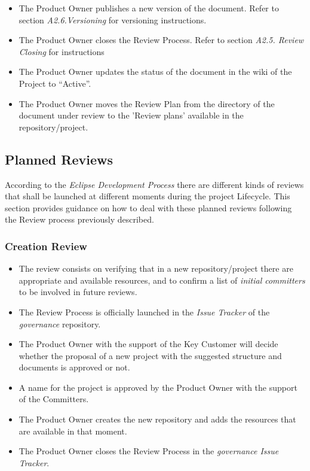 \documentclass{template/openetcs_article}
\begin{document}
\begin{itemize}
\item The Product Owner publishes a new version of the document. Refer to section {\it A2.6.Versioning} for versioning instructions.
\item The Product Owner closes the Review Process. Refer to section {\it A2.5. Review Closing} for instructions 
\item The Product Owner updates the status of the document in the wiki of the Project to “Active”.
\item The Product Owner moves the Review Plan from the directory of the document under review to the 'Review plans' available in the repository/project.
\end{itemize}

\subsection{Planned Reviews}

According to the {\it Eclipse Development Process} there are different kinds of reviews that shall be launched at different moments during the project Lifecycle. This section provides guidance on how to deal with these planned reviews following the Review process previously described.

\subsubsection{Creation Review}
\begin{itemize}
\item The review consists on verifying that in a new repository/project there are appropriate and available resources, and to confirm a list of {\it initial committers} to be involved in future reviews. 
\item The Review Process is officially launched in the {\it Issue Tracker} of the {\it governance} repository.
\item The Product Owner with the support of the Key Customer will decide whether the proposal of a new project with the suggested structure and documents is approved or not.
\item A name for the project is approved by the Product Owner with the support of the Committers.
\item The Product Owner creates the new repository and adds the resources that are available in that moment. 
\item The Product Owner closes the Review Process in the {\it governance Issue Tracker}.
\end{itemize}
\end{document}
